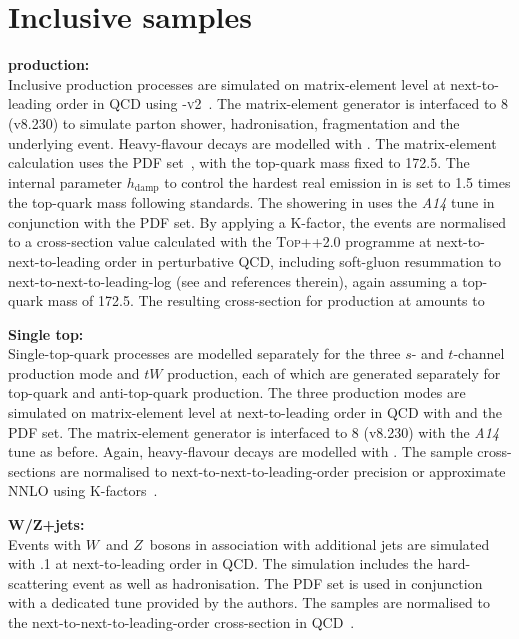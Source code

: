 \section{Inclusive samples}
\label{sec:used-incl-sampl}
\textbf{\ttbar production:}\\
Inclusive \ttbar production processes are simulated on matrix-element level at next-to-leading order in QCD using \powhegbox{}-\textsc{v2}~\cite{Nason:2004rx,Frixione:2007vw,Alioli:2010xd}. The matrix-element generator is interfaced to \pythia{}8 (v8.230) to simulate parton shower, hadronisation, fragmentation and the underlying event. Heavy-flavour decays are modelled with \evtgen. The matrix-element calculation uses the \nnpdfnlo PDF set~\cite{Ball:2014uwa}, with the top-quark mass fixed to \SI{172.5}{\gev}. The internal parameter $h_{\text{damp}}$ to control the hardest real emission in \POWHEG is set to 1.5 times the top-quark mass following \atlas standards. The showering in \pythia uses the \emph{A14} tune in conjunction with the \nnpdflo PDF set. By applying a K-factor, the events are normalised to a cross-section value calculated with the \textsc{Top++2.0} programme at next-to-next-to-leading order in perturbative QCD, including soft-gluon resummation to next-to-next-to-leading-log (see \cite{Czakon:2011xx} and references therein), again assuming a top-quark mass of \SI{172.5}{\gev}. The resulting cross-section for \ttbar production at \sqrtsfull amounts to %

\textbf{Single top:}\\
Single-top-quark processes are modelled separately for the three $s$- and $t$-channel production mode and $tW$ production, 
each of which are generated separately for top-quark and anti-top-quark production. The three production modes are simulated on matrix-element level at next-to-leading order in QCD with \powhegbox and the \nnpdflo PDF set. The matrix-element generator is interfaced to \pythia{}8 (v8.230) with the \emph{A14} tune as before. Again, heavy-flavour decays are modelled with \evtgen. The sample cross-sections are normalised to next-to-next-to-leading-order precision or approximate NNLO using K-factors~\cite{Kidonakis:2010tc,Kidonakis:2010ux,Kidonakis:2011wy}. 

\textbf{W/Z+jets:}\\
Events with $W$~and $Z$~bosons in association with additional jets are simulated with .1 at next-to-leading order in QCD. The simulation includes the hard-scattering event as well as hadronisation. The \nnpdfnlo PDF set is used in conjunction with a dedicated tune provided by the \sherpa authors. The samples are normalised to the next-to-next-to-leading-order cross-section in QCD~\cite{ATLAS-CONF-2015-039}.

